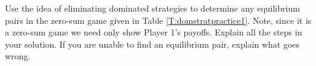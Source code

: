 





\begin{xca}\label{E:domstratpractice1}
Use the idea of eliminating dominated strategies to determine any equilibrium pairs in the zero-sum game given in Table \ref{T:domstratpractice1}. Note, since it is a zero-sum game we need only show Player 1's payoffs. Explain all the steps in your solution. If you are unable to find an equilibrium pair, explain what goes wrong.




\end{xca}
